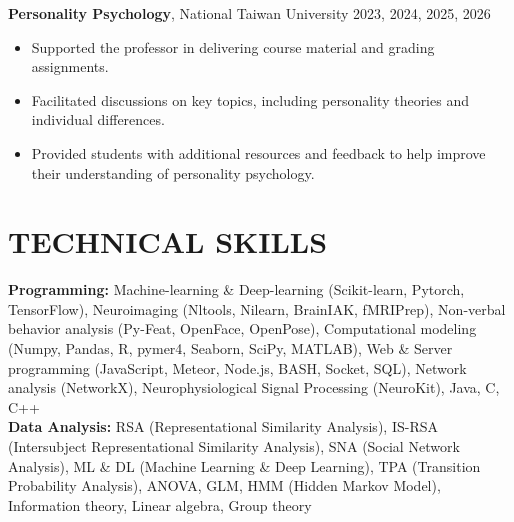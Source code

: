\documentclass[a4paper,12pt]{article}
\newcommand{\itemspace}{7pt} %
\begin{document}
\noindent\textbf{Personality Psychology}, National Taiwan University \hfill 2023, 2024, 2025, 2026
\begin{itemize}
    \item Supported the professor in delivering course material and grading assignments.
    \item Facilitated discussions on key topics, including personality theories and individual differences.
    \item Provided students with additional resources and feedback to help improve their understanding of personality psychology.
\end{itemize}

\vspace{7pt}

\section*{TECHNICAL SKILLS}
\textbf{Programming:} Machine-learning \& Deep-learning (Scikit-learn, Pytorch, TensorFlow), Neuroimaging (Nltools, Nilearn, BrainIAK, fMRIPrep), Non-verbal behavior analysis (Py-Feat, OpenFace, OpenPose), Computational modeling (Numpy, Pandas, R, pymer4, Seaborn, SciPy, MATLAB), Web \& Server programming (JavaScript, Meteor, Node.js, BASH, Socket, SQL), Network analysis (NetworkX), Neurophysiological Signal Processing (NeuroKit), Java, C, C++ \\[\itemspace]
\noindent\textbf{Data Analysis:} RSA (Representational Similarity Analysis), IS-RSA (Intersubject Representational Similarity Analysis), SNA (Social Network Analysis), ML \& DL (Machine Learning \& Deep Learning), TPA (Transition Probability Analysis), ANOVA, GLM, HMM (Hidden Markov Model), Information theory, Linear algebra, Group theory

\thispagestyle{lastupdate}
\end{document}
